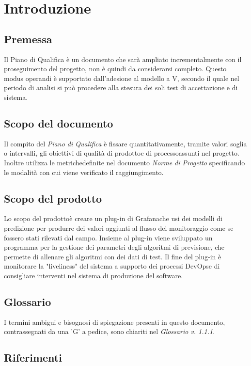 \section{Introduzione}
	\subsection{Premessa}
	Il Piano di Qualifica è un documento che sarà ampliato incrementalmente con il proseguimento del progetto\glo, non è quindi da considerarsi completo. Questo modus operandi è supportato dall'adesione al modello a V\glo, secondo il quale nel periodo di analisi si può procedere alla stesura dei soli test di accettazione e di sistema.
	
	\subsection{Scopo del documento}
	Il compito del \textit{Piano di Qualifica} è fissare quantitativamente, tramite valori soglia o intervalli, gli obiettivi di qualità di prodotto\glosp e di processo\glosp assunti nel progetto\glo. Inoltre utilizza le metriche\glosp definite nel documento \textit{Norme di Progetto} specificando le modalità con cui viene verificato il raggiungimento.

	\subsection{Scopo del prodotto}
	Lo scopo del prodotto\glosp è creare un plug-in di Grafana\glosp che usi dei modelli di predizione per produrre dei valori aggiunti al flusso del monitoraggio come se fossero stati rilevati dal campo. Insieme al plug-in viene sviluppato un programma per la gestione dei parametri degli algoritmi di previsione, che permette di allenare gli algoritmi con dei dati di test. Il fine del plug-in è monitorare la "liveliness" del sistema a supporto dei processi DevOps\glosp e di consigliare interventi nel sistema di produzione del software.
	
	\subsection{Glossario}
	I termini ambigui e bisognosi di spiegazione presenti in questo documento, contrassegnati da una 'G' a pedice, sono chiariti nel \textit{Glossario v. 1.1.1}.
	
	\subsection{Riferimenti}
